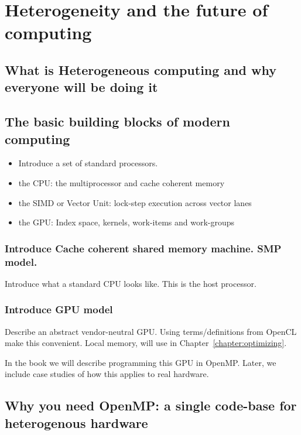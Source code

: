
\chapter{Heterogeneity and the future of computing}

\section{What is Heterogeneous computing and why everyone will be doing it}

\section{The basic building blocks of modern computing}

\begin{itemize}
\item Introduce a set of standard processors.
\item  the CPU: the multiprocessor and cache coherent memory
\item  the SIMD or Vector Unit: lock-step execution across vector lanes
\item  the GPU:  Index space, kernels, work-items and work-groups
\end{itemize}

\subsection{Introduce Cache coherent shared memory machine. SMP model.}
Introduce what a standard CPU looks like. This is the host processor.

\subsection{Introduce GPU model}
Describe an abstract vendor-neutral GPU.
Using terms/definitions from OpenCL make this convenient.
Local memory, will use in Chapter~\ref{chapter:optimizing}.

In the book we will describe programming this GPU in OpenMP.
Later, we include case studies of how this applies to real hardware.


\section{Why you need OpenMP: a single code-base for heterogenous hardware}



